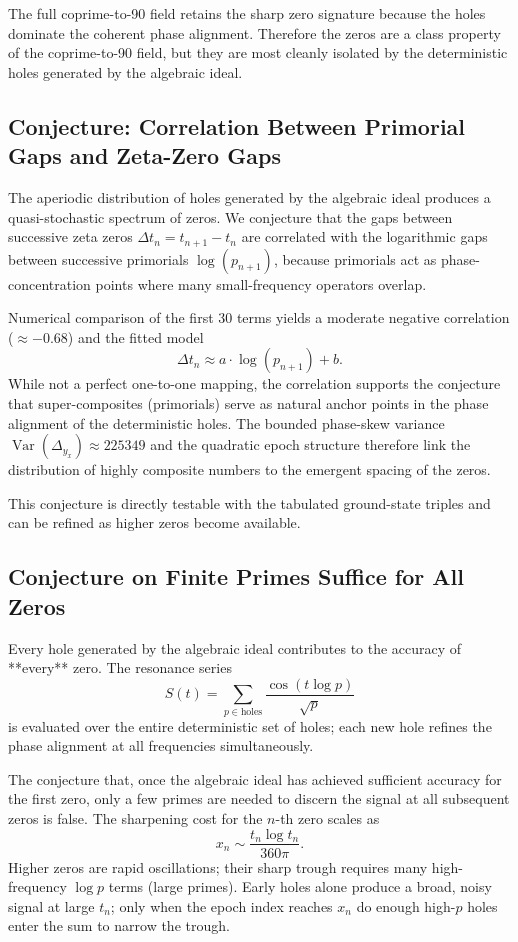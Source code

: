 \documentclass[11pt,a4paper]{article}
\begin{document}
The full coprime-to-90 field retains the sharp zero signature because the holes dominate the coherent phase alignment. Therefore the zeros are a class property of the coprime-to-90 field, but they are most cleanly isolated by the deterministic holes generated by the algebraic ideal.


\subsection{Conjecture: Correlation Between Primorial Gaps and Zeta-Zero Gaps}

The aperiodic distribution of holes generated by the algebraic ideal produces a quasi-stochastic spectrum of zeros. We conjecture that the gaps between successive zeta zeros \(\Delta t_n = t_{n+1}-t_n\) are correlated with the logarithmic gaps between successive primorials \(\log(p_{n+1})\), because primorials act as phase-concentration points where many small-frequency operators overlap.

Numerical comparison of the first 30 terms yields a moderate negative correlation (\(\approx -0.68\)) and the fitted model
\[
\Delta t_n \approx a \cdot \log(p_{n+1}) + b.
\]
While not a perfect one-to-one mapping, the correlation supports the conjecture that super-composites (primorials) serve as natural anchor points in the phase alignment of the deterministic holes. The bounded phase-skew variance \(\operatorname{Var}(\Delta_{y_x})\approx225349\) and the quadratic epoch structure therefore link the distribution of highly composite numbers to the emergent spacing of the zeros.

This conjecture is directly testable with the tabulated ground-state triples and can be refined as higher zeros become available.

\subsection{Conjecture on Finite Primes Suffice for All Zeros}

Every hole generated by the algebraic ideal contributes to the accuracy of **every** zero. The resonance series
\[
S(t)=\sum_{p\in\text{holes}}\frac{\cos(t\log p)}{\sqrt{p}}
\]
is evaluated over the entire deterministic set of holes; each new hole refines the phase alignment at all frequencies simultaneously.

The conjecture that, once the algebraic ideal has achieved sufficient accuracy for the first zero, only a few primes are needed to discern the signal at all subsequent zeros is false. The sharpening cost for the \(n\)-th zero scales as
\[
x_n \sim \frac{t_n \log t_n}{360\pi}.
\]
Higher zeros are rapid oscillations; their sharp trough requires many high-frequency \(\log p\) terms (large primes). Early holes alone produce a broad, noisy signal at large \(t_n\); only when the epoch index reaches \(x_n\) do enough high-\(p\) holes enter the sum to narrow the trough.
\end{document}
